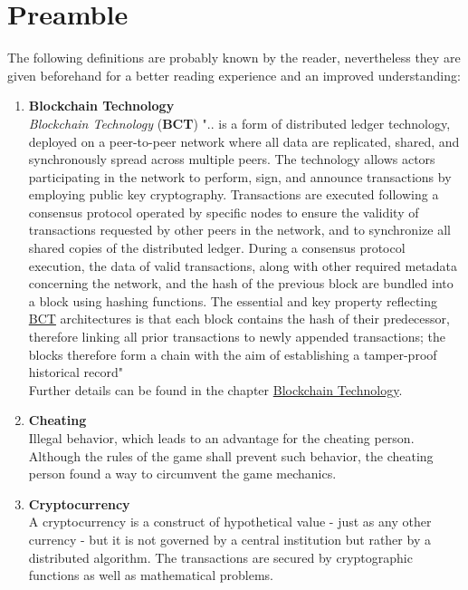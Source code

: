 \section*{Preamble}
\label{sec:Preamble}
The following definitions are probably known by the reader, nevertheless they are given beforehand for a better reading experience and an improved understanding:
\begin{enumerate}
	\item \textbf{Blockchain Technology} \label{def:BCT} \\
	\textit{Blockchain Technology} (\textbf{BCT}) ".. is a form of distributed ledger technology, deployed on a peer-to-peer network where all data are replicated, shared, and synchronously spread across multiple peers. The technology allows actors participating in the network to perform, sign, and announce transactions by employing public key cryptography. Transactions are executed following a consensus protocol operated by specific nodes to ensure the validity of transactions requested by other peers in the network, and to synchronize all shared copies of the distributed ledger. During a consensus protocol execution, the data of valid transactions, along with other required metadata concerning the network, and the hash of the previous block are bundled into a block using hashing functions. The essential and key property reflecting \hyperref[def:BCT]{BCT} architectures is that each block contains the hash of their predecessor, therefore linking all prior transactions to newly appended transactions; the blocks therefore form a chain with the aim of establishing a tamper-proof historical record"
	\cite[13]{Butijn.2020} \\
	Further details can be found in the chapter \hyperref[sec:BlockchainTech]{Blockchain Technology}.
	
	\item \textbf{Cheating}	\label{def_Cheating} \\
	Illegal behavior, which leads to an advantage for the cheating person.
	Although the rules of the game shall prevent such behavior, the cheating person found a way to circumvent the game mechanics.
	
	\item \textbf{Cryptocurrency} \label{def_Cryptocurrency} \\
	A cryptocurrency is a construct of hypothetical value - just  as any other currency - but it is not governed by a central institution but rather by a distributed algorithm.
	The transactions are secured by cryptographic functions as well as mathematical problems.
	

\end{enumerate}
